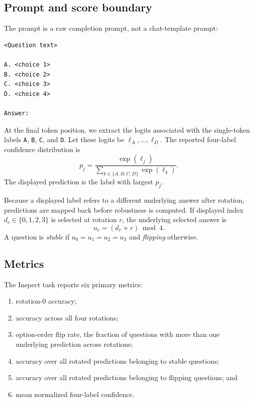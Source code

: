\documentclass[10pt]{article}
\begin{document}
\subsection{Prompt and score boundary}

The prompt is a raw completion prompt, not a chat-template prompt:

\begin{verbatim}
<Question text>

A. <choice 1>
B. <choice 2>
C. <choice 3>
D. <choice 4>

Answer:
\end{verbatim}

At the final token position, we extract the logits associated with the single-token labels \texttt{A}, \texttt{B}, \texttt{C}, and \texttt{D}. Let these logits be $\ell_A,\ldots,\ell_D$. The reported four-label confidence distribution is
\begin{equation}
 p_j = \frac{\exp(\ell_j)}{\sum_{k\in\{A,B,C,D\}}\exp(\ell_k)}.
\end{equation}
The displayed prediction is the label with largest $p_j$.

Because a displayed label refers to a different underlying answer after rotation, predictions are mapped back before robustness is computed. If displayed index $d_r\in\{0,1,2,3\}$ is selected at rotation $r$, the underlying selected answer is
\begin{equation}
 u_r=(d_r+r)\bmod 4.
\end{equation}
A question is \emph{stable} if $u_0=u_1=u_2=u_3$ and \emph{flipping} otherwise.

\subsection{Metrics}

The Inspect task reports six primary metrics:

\begin{enumerate}
\item rotation-0 accuracy;
\item accuracy across all four rotations;
\item option-order flip rate, the fraction of questions with more than one underlying prediction across rotations;
\item accuracy over all rotated predictions belonging to stable questions;
\item accuracy over all rotated predictions belonging to flipping questions; and
\item mean normalized four-label confidence.
\end{enumerate}
\end{document}
